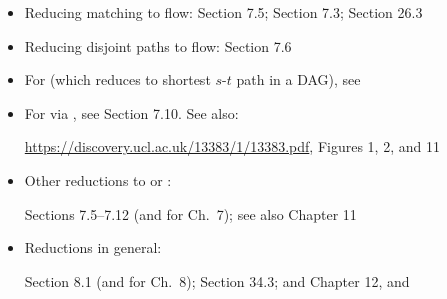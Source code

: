 \begin{itemize}
\item Reducing matching to flow:
  \KT Section 7.5;
  \DPV Section 7.3;
  \CLRS Section 26.3

\item Reducing disjoint paths to flow:
  \KT Section 7.6

\item For  (which reduces to shortest $s$-$t$ path in a DAG), see
  


\item For  via , see \KT Section 7.10.  See also:

  \url{https://discovery.ucl.ac.uk/13383/1/13383.pdf}, Figures 1, 2, and 11

\item Other reductions to  or :

  \KT Sections 7.5--7.12 (and \KWSlides for Ch.~7); see also \JE Chapter 11 

\item Reductions in general:

  \KT Section 8.1 (and \KWSlides for Ch.~8);  \CLRS Section 34.3; and \JE Chapter 12, and

\end{itemize}

